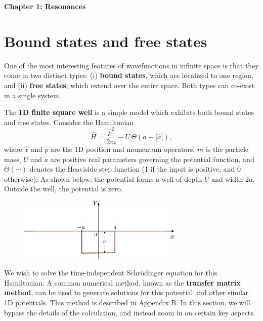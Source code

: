 \documentclass[pra,12pt]{revtex4}
\begin{document}
\begin{center}
{\Large \textbf{Chapter 1: Resonances}}
\end{center}

\section{Bound states and free states}

One of the most interesting features of wavefunctions in infinite
space is that they come in two distinct types: (i) \textbf{bound
  states}, which are localized to one region, and (ii) \textbf{free
  states}, which extend over the entire space.  Both types can
co-exist in a single system.

The \textbf{1D finite square well} is a simple model which exhibits
both bound states and free states.  Consider the Hamiltonian
$$\hat{H} = \frac{\hat{p}^2}{2m} - U \,\Theta(a -|\hat{x}|),$$
where $\hat{x}$ and $\hat{p}$ are the 1D position and momentum
operators, $m$ is the particle mass, $U$ and $a$ are positive real
parameters governing the potential function, and $\Theta(\cdots)$
denotes the Heaviside step function (1 if the input is positive, and 0
otherwise).  As shown below, the potential forms a well of depth $U$
and width $2a$.  Outside the well, the potential is zero.

\begin{figure}[h]
  \centering\includegraphics[width=0.7\textwidth]{squarewell}
\end{figure}

We wish to solve the time-independent Schr\"odinger equation for this
Hamiltonian.  A common numerical method, known as the \textbf{transfer
  matrix method}, can be used to generate solutions for this potential
and other similar 1D potentials.  This method is described in Appendix
B.  In this section, we will bypass the details of the calculation,
and instead zoom in on certain key aspects.
\end{document}
